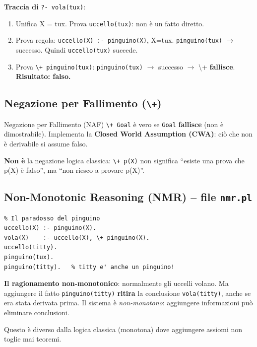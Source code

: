 \documentclass[12pt,a4paper]{article}
\begin{document}
\textbf{Traccia di} \texttt{?- vola(tux)}:
\begin{enumerate}[noitemsep]
  \item Unifica X = tux. Prova \texttt{uccello(tux)}: non è un fatto diretto.
  \item Prova regola: \texttt{uccello(X) :- pinguino(X)}, X=tux. \texttt{pinguino(tux)} $\to$ successo. Quindi \texttt{uccello(tux)} succede.
  \item Prova \texttt{\textbackslash+ pinguino(tux)}: \texttt{pinguino(tux)} $\to$ successo $\to$ \textbackslash+ \textbf{fallisce}. \textbf{Risultato: falso.}
\end{enumerate}

\subsection{Negazione per Fallimento (\texttt{\textbackslash+})}

\begin{defbox}{Negazione per Fallimento (NAF)}
\texttt{\textbackslash+ Goal} è vero se \texttt{Goal} \textbf{fallisce} (non è dimostrabile).
Implementa la \textbf{Closed World Assumption (CWA)}: ciò che non è derivabile
si assume falso.

\textbf{Non è} la negazione logica classica: \texttt{\textbackslash+ p(X)} non significa
``esiste una prova che p(X) è falso'', ma ``non riesco a provare p(X)''.
\end{defbox}

\subsection{Non-Monotonic Reasoning (NMR) -- file \texttt{nmr.pl}}

\begin{lstlisting}
% Il paradosso del pinguino
uccello(X) :- pinguino(X).
vola(X)    :- uccello(X), \+ pinguino(X).
uccello(titty).
pinguino(tux).
pinguino(titty).   % titty e' anche un pinguino!
\end{lstlisting}

\textbf{Il ragionamento non-monotonico}: normalmente gli uccelli volano.
Ma aggiungere il fatto \texttt{pinguino(titty)} \textbf{ritira} la conclusione
\texttt{vola(titty)}, anche se era stata derivata prima. Il sistema è
\emph{non-monotono}: aggiungere informazioni può eliminare conclusioni.

Questo è diverso dalla logica classica (monotona) dove aggiungere assiomi non
toglie mai teoremi.
\end{document}
